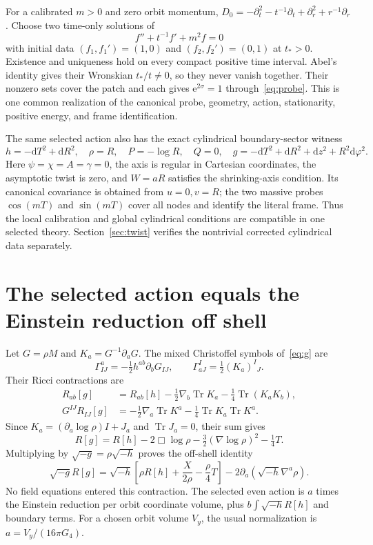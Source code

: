 \documentclass[11pt]{article}
\newcommand{\Tr}{\operatorname{Tr}}
\newcommand{\dd}{\mathrm d}
\newcommand{\vol}{\sqrt{-h}}
\newcommand{\e}{\mathrm e}
\begin{document}
For a calibrated $m>0$ and zero orbit momentum, $D_0=-\partial_t^2-t^{-1}\partial_t+\partial_r^2+r^{-1}\partial_r$. Choose two time-only solutions of
\begin{equation}
 f''+t^{-1}f'+m^2f=0
\end{equation}
with initial data $(f_1,f_1')=(1,0)$ and $(f_2,f_2')=(0,1)$ at $t_*>0$. Existence and uniqueness hold on every compact positive time interval. Abel's identity gives their Wronskian $t_*/t\ne0$, so they never vanish together. Their nonzero sets cover the patch and each gives $\e^{2\sigma}=1$ through~\eqref{eq:probe}. This is one common realization of the canonical probe, geometry, action, stationarity, positive energy, and frame identification.

The same selected action also has the exact cylindrical boundary-sector witness
\begin{equation}
 h=-\dd T^2+\dd R^2,\quad \rho=R,\quad P=-\log R,\quad Q=0,
 \quad g=-\dd T^2+\dd R^2+\dd z^2+R^2\dd\varphi^2.
\end{equation}
Here $\psi=\chi=A=\gamma=0$, the axis is regular in Cartesian coordinates, the asymptotic twist is zero, and $W=aR$ satisfies the shrinking-axis condition. Its canonical covariance is obtained from $u=0,v=R$; the two massive probes $\cos(mT)$ and $\sin(mT)$ cover all nodes and identify the literal frame. Thus the local calibration and global cylindrical conditions are compatible in one selected theory. Section~\ref{sec:twist} verifies the nontrivial corrected cylindrical data separately.

\section{The selected action equals the Einstein reduction off shell}

Let $G=\rho M$ and $K_a=G^{-1}\partial_aG$. The mixed Christoffel symbols of~\eqref{eq:g} are
\begin{equation}
 \Gamma^a_{IJ}=-\tfrac12h^{ab}\partial_bG_{IJ},\qquad
 \Gamma^I_{aJ}=\tfrac12(K_a)^I{}_J.
\end{equation}
Their Ricci contractions are
\begin{align}
 R_{ab}[g]&=R_{ab}[h]-\tfrac12\nabla_b\Tr K_a-\tfrac14\Tr(K_aK_b),\\
 G^{IJ}R_{IJ}[g]&=-\tfrac12\nabla_a\Tr K^a-\tfrac14\Tr K_a\Tr K^a.
\end{align}
Since $K_a=(\partial_a\log\rho)I+J_a$ and $\Tr J_a=0$, their sum gives
\begin{equation}
 R[g]=R[h]-2\Box\log\rho-\tfrac32(\nabla\log\rho)^2-\tfrac14T.
\end{equation}
Multiplying by $\sqrt{-g}=\rho\vol$ proves the off-shell identity
\begin{equation}\label{eq:EH}
 \boxed{\sqrt{-g}R[g]=\vol\left[\rho R[h]+\frac X{2\rho}-\frac\rho4T\right]
 -2\partial_a(\vol\nabla^a\rho).}
\end{equation}
No field equations entered this contraction. The selected even action is $a$ times the Einstein reduction per orbit coordinate volume, plus $b\int\vol R[h]$ and boundary terms. For a chosen orbit volume $V_y$, the usual normalization is $a=V_y/(16\pi G_4)$.
\end{document}
